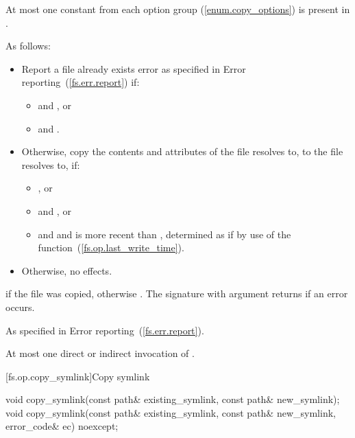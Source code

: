 \begin{itemdescr}
\pnum
\requires At most one constant from each 
  option group (\ref{enum.copy_options}) is present
  in .

\pnum
\effects
As follows:
\begin{itemize}
\item
Report a file already exists error as specified in
    Error reporting~(\ref{fs.err.report}) if:
\begin{itemize}
\item {} and , or
\item {} and .
\end{itemize}

\item
Otherwise, copy the contents and attributes of the file 
    resolves to, to the file  resolves to, if:
\begin{itemize}
\item {}, or
\item {} and , or
\item {} and  and 
      is more recent than , determined as if by use of the  function~(\ref{fs.op.last_write_time}).
\end{itemize}

\item
Otherwise, no effects.
\end{itemize}

\pnum
\returns {} if the  file
  was copied, otherwise . The signature with argument  returns
   if an error occurs.

\pnum
\throws As specified in Error reporting~(\ref{fs.err.report}).

\pnum
\complexity At most one direct or indirect invocation of .
\end{itemdescr}

[fs.op.copy_symlink]{Copy symlink}

%
\begin{itemdecl}
void copy_symlink(const path& existing_symlink, const path& new_symlink);
void copy_symlink(const path& existing_symlink, const path& new_symlink,
                  error_code& ec) noexcept;
\end{itemdecl}

